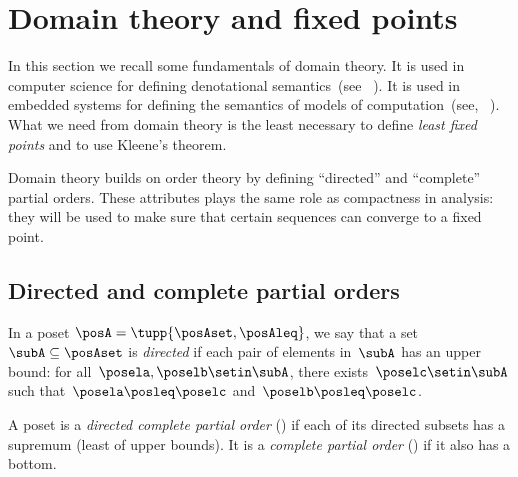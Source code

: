 
\section{Domain theory and fixed points}
\label{sec:Monotonicity-and-fixed}

In this section we recall some fundamentals of domain theory.
It is used in computer science for defining denotational semantics~(see \eg~\cite{manes86}).
It is used in embedded systems for defining the semantics of models of computation~(see, \eg~\cite{lee10}).
What we need from domain theory is the least necessary to define \emph{least fixed points} and to use Kleene's theorem.

Domain theory builds on order theory by defining ``directed'' and ``complete'' partial orders.
These attributes plays the same role as compactness in analysis: they will be used to make sure that certain sequences can converge to a fixed point.

\subsection{Directed and complete partial orders}

\begin{definition}
    \label{def:directed-set}
    In a poset $\posA = \tupp{\posAset, \posAleq}$, we say that a set~$\subA\subseteq\posAset$ is \emph{directed} if each pair of elements in~$\subA$ has an upper bound: for all~$\posela,\poselb \setin \subA$, there exists~$\poselc\setin \subA$ such that~$\posela\posleq \poselc$ and~$\poselb\posleq \poselc$.
\end{definition}


\begin{definition}[Completeness]
    \label{def:cpo}
    A poset is a \emph{directed complete partial order} (\DCPO) if each of its directed subsets has a supremum (least of upper bounds).
    It is a \emph{complete partial order} (\CPO) if it also has a bottom.
\end{definition}


